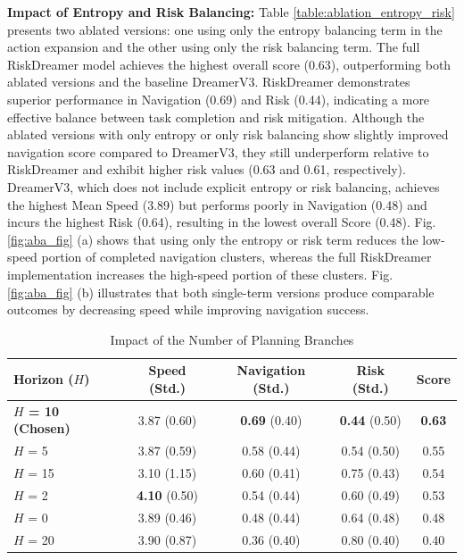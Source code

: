 \textbf{Impact of Entropy and Risk Balancing:}
Table \ref{table:ablation_entropy_risk} presents two ablated versions: one using only the entropy balancing term in the action expansion and the other using only the risk balancing term. The full RiskDreamer model achieves the highest overall score (0.63), outperforming both ablated versions and the baseline DreamerV3. RiskDreamer demonstrates superior performance in Navigation (0.69) and Risk (0.44), indicating a more effective balance between task completion and risk mitigation. Although the ablated versions with only entropy or only risk balancing show slightly improved navigation score compared to DreamerV3, they still underperform relative to RiskDreamer and exhibit higher risk values (0.63 and 0.61, respectively). DreamerV3, which does not include explicit entropy or risk balancing, achieves the highest Mean Speed (3.89) but performs poorly in Navigation (0.48) and incurs the highest Risk (0.64), resulting in the lowest overall Score (0.48). Fig. \ref{fig:aba_fig} (a) shows that using only the entropy or risk term reduces the low-speed portion of completed navigation clusters, whereas the full RiskDreamer implementation increases the high-speed portion of these clusters. Fig. \ref{fig:aba_fig} (b) illustrates that both single-term versions produce comparable outcomes by decreasing speed while improving navigation success.

\begin{table}[!ht]
    \caption{Impact of the Number of Planning Branches}
    \label{table:ablation_plan_len}
    \centering
    \begin{tabular}{lcccc}
    \toprule
    Horizon ($H$) & Speed (Std.) & Navigation (Std.) & Risk (Std.) & Score \\
    \midrule
    \rowcolor{lightgray} \textbf{$H$ = 10 (Chosen)} & 3.87 (0.60) & \textbf{0.69} (0.40) & \textbf{0.44} (0.50) & \textbf{0.63} \\
    $H$ = 5 & 3.87 (0.59) & 0.58 (0.44) & 0.54 (0.50) & 0.55 \\
    $H$ = 15 & 3.10 (1.15) & 0.60 (0.41) & 0.75 (0.43) & 0.54 \\
    $H$ = 2 & \textbf{4.10} (0.50) & 0.54 (0.44) & 0.60 (0.49) & 0.53 \\
    $H$ = 0 & 3.89 (0.46) & 0.48 (0.44) & 0.64 (0.48) & 0.48 \\
    $H$ = 20 & 3.90 (0.87) & 0.36 (0.40) & 0.80 (0.40) & 0.40 \\
    \bottomrule
    \end{tabular}
\end{table}

